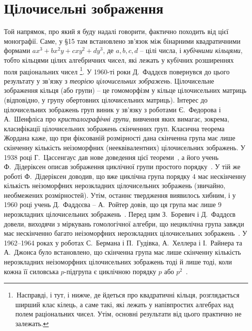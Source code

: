 \section{Цілочисельні зображення}
Той напрямок, про який я буду надалі говорити, фактично походить від цієї монографії. 
Саме, у \S15 там встановлено зв'язок між бінарними квадратичними формами $ax^3+bx^2y+cxy^2+dy^3$, де $a,b,c,d$ -- цілі числа, і \emph{кубічними кільцями}, тобто
кільцями цілих алгебричних чисел, які лежать у кубічних розширеннях поля раціональних чисел%
\footnote{\,Насправді, і тут, і нижче, де йдеться про квадратичні кільця, розглядається ширший клас кілець, а саме такі, які лежать у напівпростих алгебрах над полем раціональних чисел. 
Утім, основні результати від цього практично не залежать.}.
У 1960-ті роки Д.~Фаддєєв повернувся до цього  результату у зв'язку з \emph{теорією цілочисельних зображень}.
Цілочисельне зображення кільця (або групи) -- це гомоморфізм у кільце цілочисельних матриць (відповідно, у групу обертовних цілочисельних матриць). Інтерес до цілочисельних зображень груп виник у зв'язку з роботами Є.~Федорова і А.~Шенфліса про \emph{кристалографічні групи}, вивчення яких вимагає, зокрема, класифікації цілочисельних зображень скінченних груп. 
Класична теорема Жордана каже, що при фіксованій розмірності дана скінченна група має лише скінченну кількість неізоморфних (нееквівалентних) цілочисельних зображень. 
У 1938 році Г.~Цассенгаус дав нове доведення цієї теореми~\cite{Zas}, а його учень Ф.~Дідеріксен описав зображення циклічної групи простого порядку~\cite{Die}. 
У тій же роботі Ф.~Дідеріксен доводив, що вже циклічна група порядку $4$ має нескінченну кількість неізоморфних нерозкладних цілочисельних зображень (звичайно, необмежених розмірностей). 
Утім, останнє твердження виявилось хибним, і у 1960 році учень Д.~Фаддєєва -- А.~Ройтер довів, що ця група має лише 9 нерозкладних цілочисельних зображень~\cite{Roiter0}. 
Перед цим З.~Боревич і Д.~Фаддєєв довели, виходячи з міркувань гомологічної алгебри, що нециклічна група завжди має нескінченно багато неізоморфних нерозкладних
цілочисельних зображень~\cite{BFhom}.
У 1962--1964 роках у роботах С.~Бермана і П.~Гудівка, А.~Хеллера і І.~Райнера та А.~Джонса було встановлено, що скінченна група має лише скінченну кількість нерозкладних неізоморфних цілочисельних зображень тоді й лише тоді, коли кожна її силовська $p$-підгрупа є циклічною порядку $p$ або $p^2$~\cite{BG0,BG1,HR1,HR2,Jones}.


